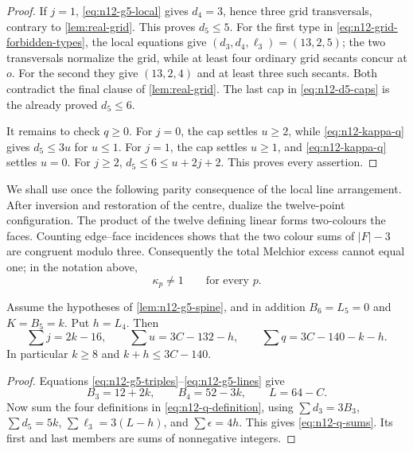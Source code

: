 \begin{proof}
If $j=1$, \eqref{eq:n12-g5-local} gives $d_4=3$, hence three grid
transversals, contrary to \cref{lem:real-grid}.  This proves
$d_5\le5$.  For the first type in \eqref{eq:n12-grid-forbidden-types}, the
local equations give $(d_3,d_4,\ell_3)=(13,2,5)$; the two transversals
normalize the grid, while at least four ordinary grid secants concur at
$o$.  For the second they give $(13,2,4)$ and at least three such secants.
Both contradict the final clause of \cref{lem:real-grid}.  The last cap in
\eqref{eq:n12-d5-caps} is the already proved $d_5\le6$.

It remains to check $q\ge0$.  For $j=0$, the cap settles $u\ge2$, while
\eqref{eq:n12-kappa-q} gives $d_5\le3u$ for $u\le1$.  For $j=1$, the cap
settles $u\ge1$, and \eqref{eq:n12-kappa-q} settles $u=0$.  For $j\ge2$,
$d_5\le6\le u+2j+2$.  This proves every assertion.
\end{proof}

We shall use once the following parity consequence of the local line
arrangement.  After inversion and restoration of the centre, dualize the
twelve-point configuration.  The product of the twelve defining linear
forms two-colours the faces.  Counting edge--face incidences shows that the
two colour sums of $|F|-3$ are congruent modulo three.  Consequently the
total Melchior excess cannot equal one; in the notation above,
\begin{equation}\label{eq:n12-even-cell}
 \kappa_p\ne1\qquad\text{for every }p.
\end{equation}

\begin{lemma}\label{lem:n12-g5-qfront}
Assume the hypotheses of \cref{lem:n12-g5-spine}, and in addition
$B_6=L_5=0$ and $K=B_5=k$.  Put $h=L_4$.  Then
\begin{equation}\label{eq:n12-q-sums}
 \sum j=2k-16,\qquad
 \sum u=3C-132-h,\qquad
 \sum q=3C-140-k-h.
\end{equation}
In particular $k\ge8$ and $k+h\le3C-140$.
\end{lemma}

\begin{proof}
Equations \eqref{eq:n12-g5-triples}--\eqref{eq:n12-g5-lines} give
\[
 B_3=12+2k,\qquad B_4=52-3k,\qquad L=64-C.
\]
Now sum the four definitions in \eqref{eq:n12-q-definition}, using
$\sum d_3=3B_3$, $\sum d_5=5k$, $\sum\ell_3=3(L-h)$, and
$\sum\epsilon=4h$.  This gives \eqref{eq:n12-q-sums}.  Its first and last
members are sums of nonnegative integers.
\end{proof}

